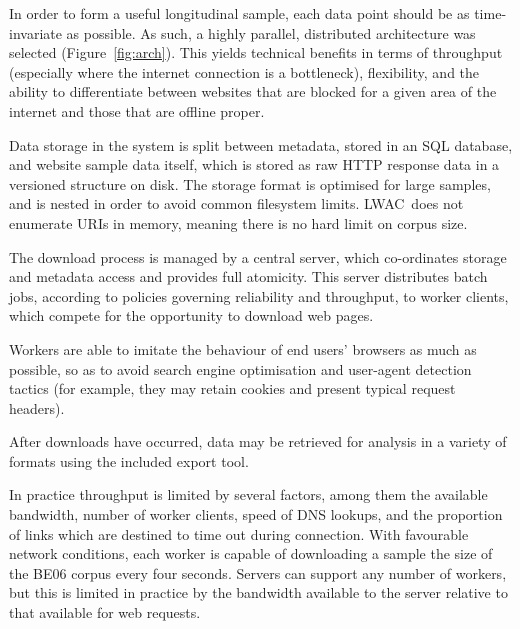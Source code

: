 \documentclass[11pt]{article}
\newcommand{\toolname}{LWAC}
\begin{document}
In order to form a useful longitudinal sample, each data point should be as time-invariate as possible.  As such, a highly parallel, distributed architecture was selected (Figure~\ref{fig:arch}).  This yields technical benefits in terms of throughput (especially where the internet connection is a bottleneck), flexibility, and the ability to differentiate between websites that are blocked for a given area of the internet and those that are offline proper.

Data storage in the system is split between metadata, stored in an SQL database, and website sample data itself, which is stored as raw HTTP response data in a versioned structure on disk.  The storage format is optimised for large samples, and is nested in order to avoid common filesystem limits.  \toolname~does not enumerate URIs in memory, meaning there is no hard limit on corpus size.

The download process is managed by a central server, which co-ordinates storage and metadata access and provides full atomicity.  This server distributes batch jobs, according to policies governing reliability and throughput, to worker clients, which compete for the opportunity to download web pages.

Workers are able to imitate the behaviour of end users' browsers as much as possible, so as to avoid search engine optimisation and user-agent detection tactics (for example, they may retain cookies and present typical request headers).

After downloads have occurred, data may be retrieved for analysis in a variety of formats using the included export tool.


In practice throughput is limited by several factors, among them the available bandwidth, number of worker clients, speed of DNS lookups, and the proportion of links which are destined to time out during connection.  With favourable network conditions, each worker is capable of downloading a sample the size of the BE06 corpus every four seconds.  Servers can support any number of workers, but this is limited in practice by the bandwidth available to the server relative to that available for web requests.
\end{document}
